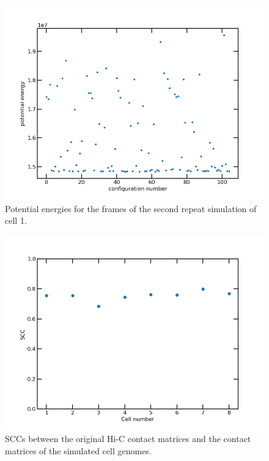 \documentclass[a4paper,11pt,oneside,final,english,toc=bib]{scrbook}
\newcommand{\figwidth}{12.0cm} %
\begin{document}
\begin{figure}[ht]
\centering
  \includegraphics[width=\figwidth]{potential_energy_cell1_2.png}
  \caption{Potential energies for the frames of the second repeat simulation of cell 1.}
  \label{fig:potential_energy_cell1_2}
\end{figure}

\begin{figure}[ht]
\centering
  \includegraphics[width=\figwidth]{hic_vs_sim_scc.png}
  \caption{SCCs between the original Hi-C contact matrices and the contact matrices of the simulated cell genomes.}
  \label{fig:hic_vs_sim_scc}
\end{figure}
\end{document}
